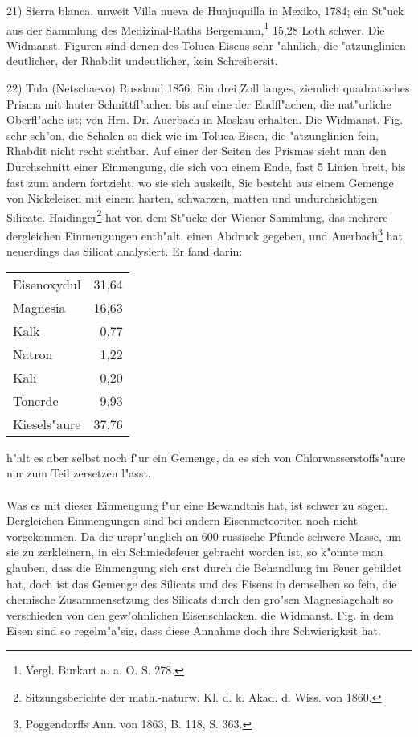 \documentclass[a4paper, 11pt, oneside]{article}
\begin{document}
21) Sierra blanca, unweit Villa nueva de Huajuquilla in Mexiko, 1784; ein St"uck aus der Sammlung des Medizinal-Raths Bergemann,\footnote{Vergl. Burkart a. a. O. S. 278.} 15,28 Loth schwer. Die Widmanst. Figuren sind denen des Toluca-Eisens sehr "ahnlich, die "atzunglinien deutlicher, der Rhabdit undeutlicher, kein Schreibersit.

22) Tula (Netschaevo) Russland 1856. Ein drei Zoll langes, ziemlich quadratisches Prisma mit lauter Schnittfl"achen bis auf eine der Endfl"achen, die nat"urliche Oberfl"ache ist; von Hrn. Dr. Auerbach in Moskau erhalten. Die Widmanst. Fig. sehr sch"on, die Schalen so dick wie im Toluca-Eisen, die "atzunglinien fein, Rhabdit nicht recht sichtbar. Auf einer der Seiten des Prismas sieht man den Durchschnitt einer Einmengung, die sich von einem Ende, fast 5 Linien breit, bis fast zum andern fortzieht, wo sie sich auskeilt, Sie besteht aus einem Gemenge von Nickeleisen mit einem harten, schwarzen, matten und undurchsichtigen Silicate. Haidinger\footnote{Sitzungsberichte der math.-naturw. Kl. d. k. Akad. d. Wiss. von 1860.} hat von dem St"ucke der Wiener Sammlung, das mehrere dergleichen Einmengungen enth"alt, einen Abdruck gegeben, und Auerbach\footnote{Poggendorffs Ann. von 1863, B. 118, S. 363.} hat neuerdings das Silicat analysiert. Er fand darin:
\begin{center}
\begin{tabular}{ l r }
    Eisenoxydul & 31,64\\
    Magnesia & 16,63\\
    Kalk & 0,77\\
    Natron & 1,22\\
    Kali & 0,20\\
    Tonerde & 9,93\\
    Kiesels"aure & 37,76\\
\end{tabular}
\end{center}
h"alt es aber selbst noch f"ur ein Gemenge, da es sich von Chlorwasserstoffs"aure nur zum Teil zersetzen l"asst.
\paragraph{}
Was es mit dieser Einmengung f"ur eine Bewandtnis hat, ist schwer zu sagen. Dergleichen Einmengungen sind bei andern Eisenmeteoriten noch nicht vorgekommen. Da die urspr"unglich an 600 russische Pfunde schwere Masse, um sie zu zerkleinern, in ein Schmiedefeuer gebracht worden ist, so k"onnte man glauben, dass die Einmengung sich erst durch die Behandlung im Feuer gebildet hat, doch ist das Gemenge des Silicats und des Eisens in demselben so fein, die chemische Zusammensetzung des Silicats durch den gro"sen Magnesiagehalt so verschieden von den gew"ohnlichen Eisenschlacken, die Widmanst. Fig. in dem Eisen sind so regelm"a"sig, dass diese Annahme doch ihre Schwierigkeit hat.
\end{document}
